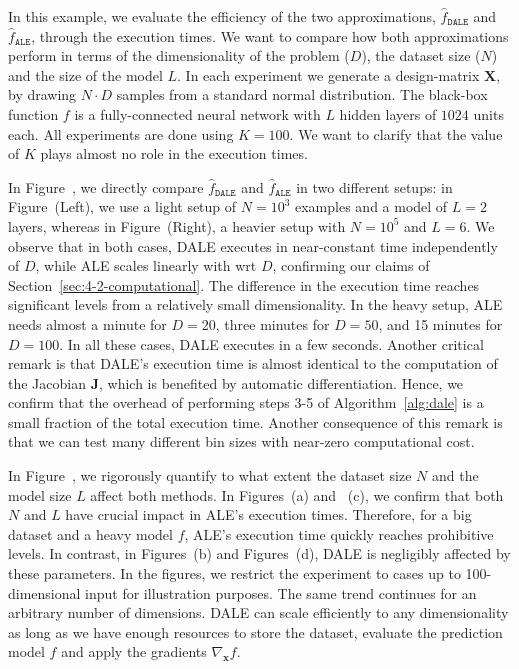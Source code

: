 \documentclass[wcp]{jmlr}
\newcommand{\dale}{\hat{f}_{\mathtt{DALE}}}
\newcommand{\xb}{\mathbf{x}}
\newcommand{\Jac}{\mathbf{J}}
\begin{document}
In this example, we evaluate the efficiency of the two approximations, \(\dale\) and \(\hat{f}_{\mathtt{ALE}}\), through the execution times. We want to compare how both approximations perform in terms of the dimensionality of the problem (\(D\)), the dataset size (\(N\)) and the size of the model \(L\). In each experiment we generate a design-matrix \( \mathbf{X} \), by drawing \( N \cdot D \) samples from a standard normal distribution. The black-box function \(f \) is a fully-connected neural network with \(L\) hidden layers of \( 1024 \) units each. All experiments are done using \(K=100\). We want to clarify that the value of \(K\) plays almost no role in the execution times.

In Figure~, we directly compare \(\dale\) and \(\hat{f}_{\mathtt{ALE}}\) in two different setups: in Figure~(Left), we use a light setup of \(N=10^3\) examples and a model of \(L=2\) layers, whereas in Figure~(Right), a heavier setup with \(N=10^5\) and \(L=6\). We observe that in both cases, DALE executes in near-constant time independently of \(D\), while ALE scales linearly with wrt \(D\), confirming our claims of Section~\ref{sec:4-2-computational}. The difference in the execution time reaches significant levels from a relatively small dimensionality. In the heavy setup, ALE needs almost a minute for \(D=20\), three minutes for \(D=50\), and 15 minutes for \(D=100\). In all these cases, DALE executes in a few seconds. Another critical remark is that DALE's execution time is almost identical to the computation of the Jacobian \( \Jac \), which is benefited by automatic differentiation. Hence, we confirm that the overhead of performing steps 3-5 of Algorithm~\ref{alg:dale} is a small fraction of the total execution time. Another consequence of this remark is that we can test many different bin sizes with near-zero computational cost.

In Figure~, we rigorously quantify to what extent the dataset size \(N\) and the model size \(L\) affect both methods. In Figures~(a) and ~(c), we confirm that both \(N\) and \(L\) have crucial impact in ALE's execution times. Therefore, for a big dataset and a heavy model \(f\), ALE's execution time quickly reaches prohibitive levels. In contrast, in Figures~(b) and Figures~(d), DALE is negligibly affected by these parameters. In the figures, we restrict the experiment to cases up to 100-dimensional input for illustration purposes. The same trend continues for an arbitrary number of dimensions. DALE can scale efficiently to any dimensionality as long as we have enough resources to store the dataset, evaluate the prediction model \(f\) and apply the gradients \(\nabla_{\xb}f\).
\end{document}

